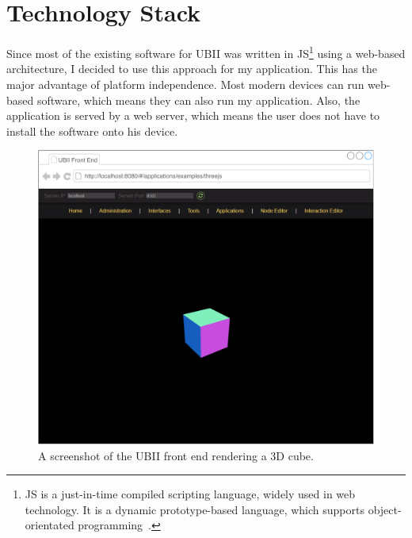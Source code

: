 \section{Technology Stack}\label{section:technology-stack}

Since most of the existing software for \ac{UBII} was written in \acf{JS}\footnote{\ac{JS} is a just-in-time compiled scripting language, widely used in web technology. It is a dynamic prototype-based language, which supports object-orientated programming~\cite[43, 47]{ECMAInternational.2018}.} using a web-based architecture, I decided to use this approach for my application. This has the major advantage of platform independence. Most modern devices can run web-based software, which means they can also run my application. Also, the application is served by a web server, which means the user does not have to install the software onto his device.

\begin{figure}[htpb]
  \centering
  \includegraphics[width=12cm]{figures/ubii_front_end.pdf}
  \caption[Screenshot of the UBII front end]{A screenshot of the UBII front end rendering a \ac{3D} cube.}\label{fig:ubii-front-end}
\end{figure}

